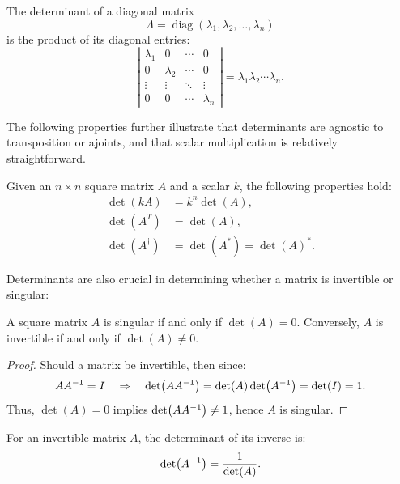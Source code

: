 \documentclass[12pt]{article}
\begin{document}
\begin{theorem}
The determinant of a diagonal matrix
\[
\Lambda = \operatorname{diag}(\lambda_1,\lambda_2,\ldots,\lambda_n)
\]
is the product of its diagonal entries:
\[
\left|
\begin{array}{cccc}
\lambda_1 & 0        & \cdots & 0 \\
0         & \lambda_2 & \cdots & 0 \\
\vdots    & \vdots   & \ddots & \vdots \\
0         & 0        & \cdots & \lambda_n
\end{array}
\right|
= \lambda_1 \lambda_2 \cdots \lambda_n.
\]
\end{theorem}

The following properties further illustrate that determinants are agnostic to transposition or ajoints, and that scalar multiplication is relatively straightforward. 

\begin{theorem}
Given an $n \times n$ square matrix $A$ and a scalar $k$, the following
properties hold:
    \begin{align*}
        \det(kA) &= k^n \det(A), \\
        \det(A^T) &= \det(A), \\
        \det(A^\dagger) &= \det(A^*) = \det(A)^*.
    \end{align*}
\end{theorem}

Determinants are also crucial in determining whether a matrix is invertible or singular:

\begin{theorem}
A square matrix $A$ is singular if and only if $\det(A) = 0$.
Conversely, $A$ is invertible if and only if $\det(A) \neq 0$.
\end{theorem}

\begin{proof}
    Should a matrix be invertible, then since:
    $$A {A}^{-1} = I \quad \Rightarrow \quad \det(A{A}^{-1}) = \det(A) \det({A}^{-1}) = \det(I) = 1.$$
    Thus, $\det(A) = 0$ implies $\det(A {A}^{-1}) \neq 1$, hence $A$ is singular.
\end{proof}

\begin{theorem}
    For an invertible matrix $A$, the determinant of its inverse is:
    $$\det({A}^{-1}) = \frac{1}{\det(A)}.$$
\end{theorem}
\end{document}

